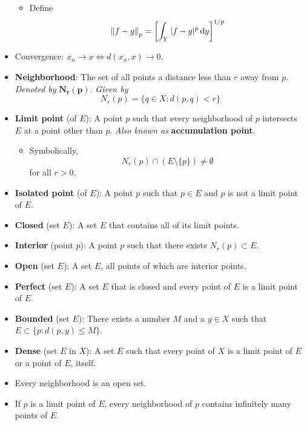 \documentclass[../../notes.tex]{subfiles}
\begin{document}
\begin{itemize}
\begin{itemize}
        \item Define
        \begin{equation*}
            \norm{f-g}_p = \left[ \int_Y|f-g|^p\dd{y} \right]^{1/p}
        \end{equation*}
    \end{itemize}
    \item Convergence: $x_n\to x\Longleftrightarrow d(x_n,x)\to 0$.
    \item \textbf{Neighborhood}: The set of all points a distance less than $r$ away from $p$. \emph{Denoted by} $\bm{N_r(p)}$. \emph{Given by}
    \begin{equation*}
        N_r(p) = \{q\in X:d(p,q)<r\}
    \end{equation*}
    \item \textbf{Limit point} (of $E$): A point $p$ such that every neighborhood of $p$ intersects $E$ at a point other than $p$. \emph{Also known as} \textbf{accumulation point}.
    \begin{itemize}
        \item Symbolically,
        \begin{equation*}
            N_r(p)\cap(E\setminus\{p\}) \neq \emptyset
        \end{equation*}
        for all $r>0$.
    \end{itemize}
    \item \textbf{Isolated point} (of $E$): A point $p$ such that $p\in E$ and $p$ is not a limit point of $E$.
    \item \textbf{Closed} (set $E$): A set $E$ that contains all of its limit points.
    \item \textbf{Interior} (point $p$): A point $p$ such that there exists $N_r(p)\subset E$.
    \item \textbf{Open} (set $E$): A set $E$, all points of which are interior points.
    \item \textbf{Perfect} (set $E$): A set $E$ that is closed and every point of $E$ is a limit point of $E$.
    \item \textbf{Bounded} (set $E$): There exists a number $M$ and a $y\in X$ such that $E\subset\{p:d(p,y)\leq M\}$.
    \item \textbf{Dense} (set $E$ in $X$): A set $E$ such that every point of $X$ is a limit point of $E$ or a point of $E$, itself.
    \item {}Every neighborhood is an open set.
    \item If $p$ is a limit point of $E$, every neighborhood of $p$ contains infinitely many points of $E$.

\end{itemize}
\end{document}
